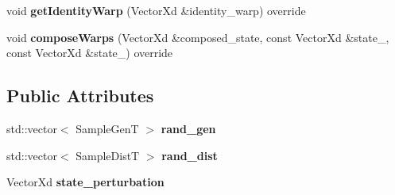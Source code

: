 \begin{DoxyCompactItemize}
\item 
\hypertarget{classProjectiveBase_abc2496e8f4f21d08b7c18059d192d7d5}{void {\bfseries get\-Identity\-Warp} (Vector\-Xd \&identity\-\_\-warp) override}\label{classProjectiveBase_abc2496e8f4f21d08b7c18059d192d7d5}

\item 
\hypertarget{classProjectiveBase_a9f458f41c73228f98aa63212b6114099}{void {\bfseries compose\-Warps} (Vector\-Xd \&composed\-\_\-state, const Vector\-Xd \&state\-\_, const Vector\-Xd \&state\-\_) override}\label{classProjectiveBase_a9f458f41c73228f98aa63212b6114099}

\end{DoxyCompactItemize}
\subsection*{Public Attributes}
\begin{DoxyCompactItemize}
\item 
\hypertarget{classProjectiveBase_af91569cc59a9cde3dc43087e8a18fb44}{std\-::vector$<$ Sample\-Gen\-T $>$ {\bfseries rand\-\_\-gen}}\label{classProjectiveBase_af91569cc59a9cde3dc43087e8a18fb44}

\item 
\hypertarget{classProjectiveBase_a1b8704a9cc46e095288475b4c6f2841a}{std\-::vector$<$ Sample\-Dist\-T $>$ {\bfseries rand\-\_\-dist}}\label{classProjectiveBase_a1b8704a9cc46e095288475b4c6f2841a}

\item 
\hypertarget{classProjectiveBase_afb931698d7deba3a69d76a006b6ef878}{Vector\-Xd {\bfseries state\-\_\-perturbation}}\label{classProjectiveBase_afb931698d7deba3a69d76a006b6ef878}

\end{DoxyCompactItemize}
